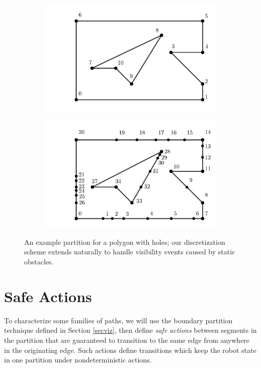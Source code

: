 \documentclass[sageh,times,Review]{sagej}
\begin{document}
\begin{figure}
\begin{subfigure}{0.5\columnwidth}
\centering
\includegraphics[width=0.9\linewidth]{median_holes.pdf}
\centering
\end{subfigure}%
\begin{subfigure}{0.5\columnwidth}
\centering
\includegraphics[width=0.9\linewidth]{median_holes_inserted.pdf}
\centering
\end{subfigure}
\caption{An example partition for a polygon with holes; our discretization
scheme extends naturally to handle visibility events caused by static obstacles.}
\label{fig:bvd_holes}
\end{figure}

\section{Safe Actions} \label{sec:safe}

To characterize some families of paths, we will use the boundary
partition technique defined in Section \ref{secviz}, then define
\emph{safe actions} between segments in the partition that are
guaranteed to transition to the same edge from anywhere in the
originating edge. Such actions define transitions which keep the
robot state in one partition under nondeterministic actions.
\end{document}
